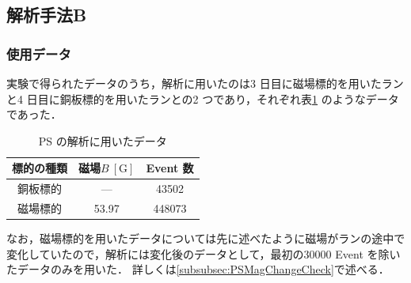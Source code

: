

%

\subsection{解析手法B}
\label{subsec:PSAnalyses}
\subsubsection{使用データ}
\label{subsubsec:PSData}
実験で得られたデータのうち，解析に用いたのは3 日目に磁場標的を用いたランと4 日目に銅板標的を用いたランとの2 つであり，それぞれ表\ref{tab:PSdata} のようなデータであった．
\begin{table}[h]
	\centering
	\caption{PS の解析に用いたデータ}
	\begin{tabular}{ccc} \toprule
	標的の種類 & 磁場$B~[\mathrm{G}]$ & Event 数 \\ \midrule
	銅板標的 & --- & 43502 \\
	磁場標的 & 53.97 & 448073 \\ \bottomrule
	\end{tabular}\label{tab:PSdata}
\end{table}%

なお，磁場標的を用いたデータについては先に述べたように磁場がランの途中で変化していたので，解析には変化後のデータとして，最初の30000 Event を除いたデータのみを用いた．
詳しくは\ref{subsubsec:PSMagChangeCheck}で述べる．

